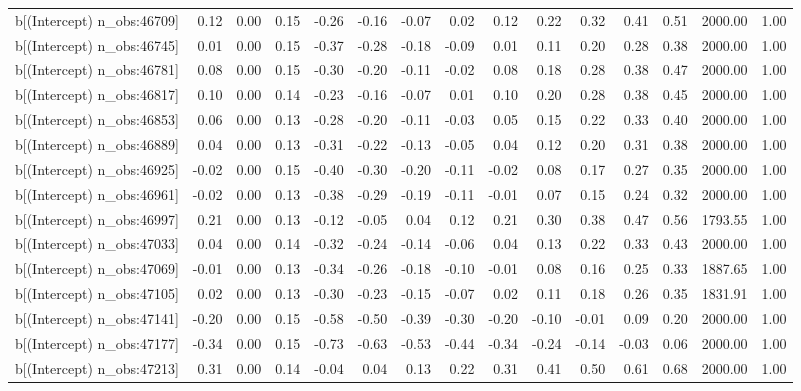 \begin{table}[ht]
\begin{tabular}{rrrrrrrrrrrrrrr}
  b[(Intercept) n\_obs:46709] & 0.12 & 0.00 & 0.15 & -0.26 & -0.16 & -0.07 & 0.02 & 0.12 & 0.22 & 0.32 & 0.41 & 0.51 & 2000.00 & 1.00 \\ 
  b[(Intercept) n\_obs:46745] & 0.01 & 0.00 & 0.15 & -0.37 & -0.28 & -0.18 & -0.09 & 0.01 & 0.11 & 0.20 & 0.28 & 0.38 & 2000.00 & 1.00 \\ 
  b[(Intercept) n\_obs:46781] & 0.08 & 0.00 & 0.15 & -0.30 & -0.20 & -0.11 & -0.02 & 0.08 & 0.18 & 0.28 & 0.38 & 0.47 & 2000.00 & 1.00 \\ 
  b[(Intercept) n\_obs:46817] & 0.10 & 0.00 & 0.14 & -0.23 & -0.16 & -0.07 & 0.01 & 0.10 & 0.20 & 0.28 & 0.38 & 0.45 & 2000.00 & 1.00 \\ 
  b[(Intercept) n\_obs:46853] & 0.06 & 0.00 & 0.13 & -0.28 & -0.20 & -0.11 & -0.03 & 0.05 & 0.15 & 0.22 & 0.33 & 0.40 & 2000.00 & 1.00 \\ 
  b[(Intercept) n\_obs:46889] & 0.04 & 0.00 & 0.13 & -0.31 & -0.22 & -0.13 & -0.05 & 0.04 & 0.12 & 0.20 & 0.31 & 0.38 & 2000.00 & 1.00 \\ 
  b[(Intercept) n\_obs:46925] & -0.02 & 0.00 & 0.15 & -0.40 & -0.30 & -0.20 & -0.11 & -0.02 & 0.08 & 0.17 & 0.27 & 0.35 & 2000.00 & 1.00 \\ 
  b[(Intercept) n\_obs:46961] & -0.02 & 0.00 & 0.13 & -0.38 & -0.29 & -0.19 & -0.11 & -0.01 & 0.07 & 0.15 & 0.24 & 0.32 & 2000.00 & 1.00 \\ 
  b[(Intercept) n\_obs:46997] & 0.21 & 0.00 & 0.13 & -0.12 & -0.05 & 0.04 & 0.12 & 0.21 & 0.30 & 0.38 & 0.47 & 0.56 & 1793.55 & 1.00 \\ 
  b[(Intercept) n\_obs:47033] & 0.04 & 0.00 & 0.14 & -0.32 & -0.24 & -0.14 & -0.06 & 0.04 & 0.13 & 0.22 & 0.33 & 0.43 & 2000.00 & 1.00 \\ 
  b[(Intercept) n\_obs:47069] & -0.01 & 0.00 & 0.13 & -0.34 & -0.26 & -0.18 & -0.10 & -0.01 & 0.08 & 0.16 & 0.25 & 0.33 & 1887.65 & 1.00 \\ 
  b[(Intercept) n\_obs:47105] & 0.02 & 0.00 & 0.13 & -0.30 & -0.23 & -0.15 & -0.07 & 0.02 & 0.11 & 0.18 & 0.26 & 0.35 & 1831.91 & 1.00 \\ 
  b[(Intercept) n\_obs:47141] & -0.20 & 0.00 & 0.15 & -0.58 & -0.50 & -0.39 & -0.30 & -0.20 & -0.10 & -0.01 & 0.09 & 0.20 & 2000.00 & 1.00 \\ 
  b[(Intercept) n\_obs:47177] & -0.34 & 0.00 & 0.15 & -0.73 & -0.63 & -0.53 & -0.44 & -0.34 & -0.24 & -0.14 & -0.03 & 0.06 & 2000.00 & 1.00 \\ 
  b[(Intercept) n\_obs:47213] & 0.31 & 0.00 & 0.14 & -0.04 & 0.04 & 0.13 & 0.22 & 0.31 & 0.41 & 0.50 & 0.61 & 0.68 & 2000.00 & 1.00 \\ 

\end{tabular}
\end{table}
